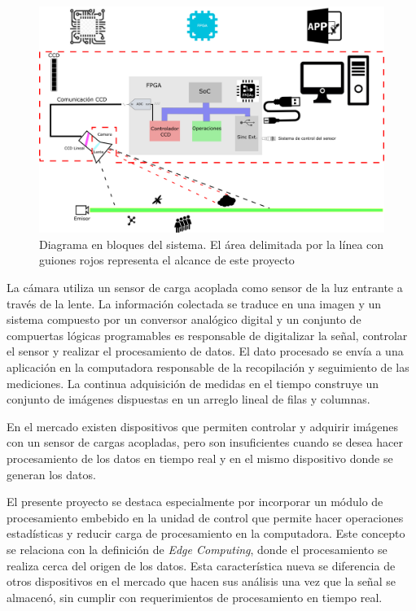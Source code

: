\documentclass[
11pt, %
codirector, %
]{charter}
\begin{document}
\begin{figure}[htpb]
\centering 
\includegraphics[width=.9\textwidth]{./Figuras/esquema_png.png}
\caption{Diagrama en bloques del sistema. El área delimitada por la línea con guiones rojos representa el alcance de este proyecto}
\label{fig:diagBloques}
\end{figure}


La cámara utiliza un sensor de carga acoplada como sensor de la luz entrante a través de la lente. La información colectada se traduce en una imagen y un sistema compuesto por un conversor analógico digital y un conjunto  de compuertas lógicas programables es responsable de digitalizar la señal, controlar el sensor y realizar el procesamiento de datos. El dato procesado se envía a una aplicación en la computadora responsable de la recopilación y seguimiento de las mediciones. La continua adquisición de medidas en el tiempo construye un conjunto de imágenes dispuestas en un arreglo lineal de filas y columnas. 

En el mercado existen dispositivos que permiten controlar y adquirir imágenes con un sensor de cargas acopladas, pero son insuficientes cuando se desea hacer procesamiento de los datos en tiempo real y en el mismo dispositivo donde se generan los datos.

El presente proyecto se destaca especialmente por incorporar un módulo de procesamiento embebido en la unidad de control que permite hacer operaciones estadísticas y reducir carga de procesamiento en la computadora. Este concepto se relaciona con la definición de \textit{Edge Computing}, donde el procesamiento se realiza cerca del origen de los datos. Esta característica nueva se diferencia de otros dispositivos en el mercado que hacen sus análisis una vez que la señal se almacenó, sin cumplir con requerimientos de procesamiento en tiempo real.
\end{document}
